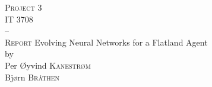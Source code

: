 \documentclass[11pt, oneside]{article}
\begin{document}
	\begin{titlepage}
		\begin{center}
			{ \Huge \textsc{Project 3\\IT 3708}\\--\\
			\textsc{Report}
			\vfill
			{ \Huge Evolving Neural Networks for a Flatland Agent}\\[0.5em]
			{ \LARGE by\\[2em]
			Per Øyvind \textsc{Kanestrøm}\\
			Bjørn \textsc{Bråthen}\\
			}
			\vfill
			}
		\end{center}
	\end{titlepage}




\end{document}
